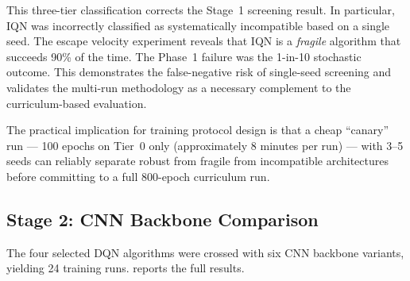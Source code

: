 This three-tier classification corrects the Stage~1 screening result. In particular, IQN was incorrectly classified as systematically incompatible based on a single seed. The escape velocity experiment reveals that IQN is a \emph{fragile} algorithm that succeeds 90\% of the time. The Phase~1 failure was the 1-in-10 stochastic outcome. This demonstrates the false-negative risk of single-seed screening and validates the multi-run methodology as a necessary complement to the curriculum-based evaluation.

The practical implication for training protocol design is that a cheap ``canary'' run --- 100 epochs on Tier~0 only (approximately 8 minutes per run) --- with 3--5 seeds can reliably separate robust from fragile from incompatible architectures before committing to a full 800-epoch curriculum run.

\subsection{Stage 2: CNN Backbone Comparison}
\label{sec:res:phase1:cnn}

The four selected DQN algorithms were crossed with six CNN backbone variants, yielding 24 training runs.  reports the full results.

